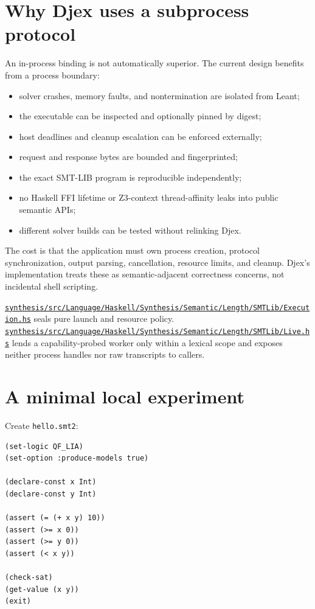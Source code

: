 \documentclass[10pt,letterpaper,oneside]{report}
\newcommand{\filepath}[1]{\nolinkurl{#1}}
\def\DjexPinnedCommit{7d65eba6f753727ae7b3d734fb4a7e00f1f44aa7}
\def\DjexBase{https://github.com/VladimirReshetnikov/Djex/blob/\DjexPinnedCommit/}
\newcommand{\dpath}[1]{\href{\DjexBase#1}{\nolinkurl{#1}}}
\begin{document}
\section{Why Djex uses a subprocess protocol}

An in-process binding is not automatically superior. The current design benefits from a process boundary:

\begin{itemize}
\item solver crashes, memory faults, and nontermination are isolated from Leant;
\item the executable can be inspected and optionally pinned by digest;
\item host deadlines and cleanup escalation can be enforced externally;
\item request and response bytes are bounded and fingerprinted;
\item the exact SMT-LIB program is reproducible independently;
\item no Haskell FFI lifetime or Z3-context thread-affinity leaks into public semantic APIs;
\item different solver builds can be tested without relinking Djex.
\end{itemize}

The cost is that the application must own process creation, protocol synchronization, output parsing, cancellation, resource limits, and cleanup. Djex's implementation treats these as semantic-adjacent correctness concerns, not incidental shell scripting.

\begin{projectnote}
\dpath{synthesis/src/Language/Haskell/Synthesis/Semantic/Length/SMTLib/Execution.hs} seals pure launch and resource policy. \dpath{synthesis/src/Language/Haskell/Synthesis/Semantic/Length/SMTLib/Live.hs} lends a capability-probed worker only within a lexical scope and exposes neither process handles nor raw transcripts to callers.
\end{projectnote}

\section{A minimal local experiment}

Create \filepath{hello.smt2}:

\begin{lstlisting}[language=SMTLib,caption={A complete first SMT-LIB script.}]
(set-logic QF_LIA)
(set-option :produce-models true)

(declare-const x Int)
(declare-const y Int)

(assert (= (+ x y) 10))
(assert (>= x 0))
(assert (>= y 0))
(assert (< x y))

(check-sat)
(get-value (x y))
(exit)
\end{lstlisting}
\end{document}
